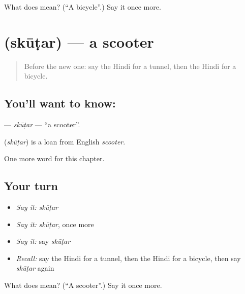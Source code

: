 \begin{tcolorbox}[breakable,colback=teal!4,colframe=teal!35!black,title={Before you move on}]
What does  mean? (\textquotedblleft{}A bicycle\textquotedblright{}.) Say it once more.
\end{tcolorbox}
\section[\texorpdfstring{\hi{स्कूटर} (skūṭar)}{स्कूटर (skūṭar)}]{ (skūṭar) — a scooter}

\label{lesson:HI-C203-skutar}



\begin{quote}
Before the new one: say the Hindi for a tunnel, then the Hindi for a bicycle.
\end{quote}

\subsection*{You'll want to know: }
\textbf{} — \emph{skūṭar} — \textquotedblleft{}a scooter\textquotedblright{}.

\begin{cousinweb}
\textbf{} (\emph{skūṭar}) is a loan from English \emph{scooter}.
\end{cousinweb}

\begin{grammarlens}[title={What you've built}]
One more word for this chapter.
\end{grammarlens}

\subsection*{Your turn}
\begin{itemize}
\raggedright
  \item \emph{Say it:} \emph{skūṭar}
  \item \emph{Say it:} \emph{skūṭar}, once more
  \item \emph{Say it:} say \emph{skūṭar}
  \item \emph{Recall:} say the Hindi for a tunnel, then the Hindi for a bicycle, then say \emph{skūṭar} again
\end{itemize}

\begin{tcolorbox}[breakable,colback=teal!4,colframe=teal!35!black,title={Before you move on}]
What does  mean? (\textquotedblleft{}A scooter\textquotedblright{}.) Say it once more.
\end{tcolorbox}
